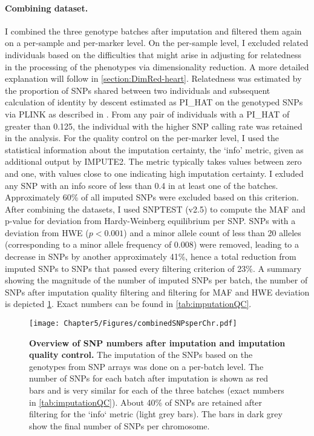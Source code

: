 \paragraph{Combining dataset.} I combined the three genotype batches after imputation and filtered them again on a per-sample and per-marker level. On the per-sample level, I excluded related individuals based on the difficulties that might arise in adjusting for relatedness in the processing of the phenotypes via dimensionality reduction. A more detailed explanation will follow in \cref{section:DimRed-heart}. Relatedness was estimated by the proportion of SNPs shared between two individuals and subsequent calculation of identity by descent estimated as PI\_HAT on the genotyped SNPs via PLINK as described in \citep{Anderson2010}. From any pair of individuals with a PI\_HAT of greater than \num{0.125}, the individual with the higher SNP calling rate was retained in the analysis. For the quality control on the per-marker level, I used the statistical information about the imputation certainty, the `info' metric,  given as additional output by IMPUTE2. The metric typically takes values between zero and one, with values close to one indicating high imputation certainty. I exluded any SNP with an info score of less than \num{0.4} in at least one of the batches. Approximately \num{60}\% of all imputed SNPs were excluded based on this criterion.  After combining the datasets, I used SNPTEST (v2.5) \citep{Marchini2010} to  compute the MAF and p-value for deviation from Hardy-Weinberg equilibrium per SNP. SNPs with a deviation from HWE (\(p <0.001\)) and a minor allele count of less than \num{20} alleles (corresponding to a minor allele frequency of \num{0.008}) were removed, leading to a decrease in SNPs by another approximately \num{41}\%, hence a total reduction from imputed SNPs to SNPs that passed every filtering criterion of \num{23}\%.  A summary showing the magnitude of the number of imputed SNPs per batch, the number of SNPs after imputation quality filtering and filtering for MAF and HWE deviation is depicted \cref{fig:imputeQC}. Exact numbers can be found in \cref{tab:imputationQC}.

\begin{figure}[hbtp]
	\centering
	\texttt{[image: Chapter5/Figures/combinedSNPsperChr.pdf]}
	\caption[\textbf{Overview of SNP numbers after imputation and imputation quality control. }]{\textbf{Overview of SNP numbers after imputation and imputation quality control. } The imputation of the SNPs based on the genotypes from SNP arrays was done on a per-batch level. The number of SNPs for each batch after imputation is shown as red bars and is very similar for each of the three batches (exact numbers in \cref{tab:imputationQC}). About \num{40}\% of SNPs are retained after filtering for the `info` metric (light grey bars). The bars in dark grey show the final number of SNPs per chromosome. }
 	\label{fig:imputeQC}
\end{figure}

